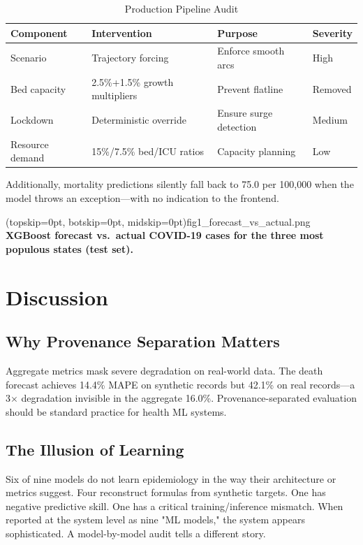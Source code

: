 \documentclass{ieeeaccess}
\begin{document}
\begin{table}[h]
\centering
\caption{Production Pipeline Audit}
\label{tab:pipeline}
\small
\begin{tabular}{lp{3cm}p{4.5cm}l}
\toprule
Component & Intervention & Purpose & Severity \\
\midrule
Scenario & Trajectory forcing & Enforce smooth arcs & High \\
Bed capacity & 2.5\%+1.5\% growth multipliers & Prevent flatline & Removed \\
Lockdown & Deterministic override & Ensure surge detection & Medium \\
Resource demand & 15\%/7.5\% bed/ICU ratios & Capacity planning & Low \\
\bottomrule
\end{tabular}
\end{table}

Additionally, mortality predictions silently fall back to 75.0 per 100,000 when the model throws an exception---with no indication to the frontend.

\Figure[t!](topskip=0pt, botskip=0pt, midskip=0pt){fig1_forecast_vs_actual.png}
{\textbf{XGBoost forecast vs.\ actual COVID-19 cases for the three most populous states (test set).}\label{fig:forecast}}

\section{Discussion}
\label{sec:discussion}

\subsection{Why Provenance Separation Matters}
Aggregate metrics mask severe degradation on real-world data. The death forecast achieves 14.4\% MAPE on synthetic records but 42.1\% on real records---a 3$\times$ degradation invisible in the aggregate 16.0\%. Provenance-separated evaluation should be standard practice for health ML systems.

\subsection{The Illusion of Learning}
Six of nine models do not learn epidemiology in the way their architecture or metrics suggest. Four reconstruct formulas from synthetic targets. One has negative predictive skill. One has a critical training/inference mismatch. When reported at the system level as nine "ML models," the system appears sophisticated. A model-by-model audit tells a different story.
\end{document}
